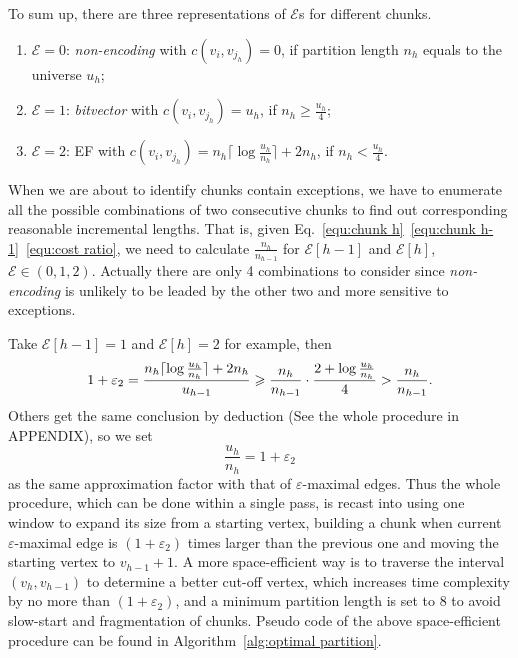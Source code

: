 \documentclass[runningheads]{comsis2}
\begin{document}
To sum up, there are three representations of $ \mathcal{E} $s for different chunks.
\begin{enumerate}
	\item $ \mathcal{E}=0 $: \textit{non-encoding} with $c\left(v_{i}, v_{j_{h}}\right)=0$, if partition length $n_{h}$ equals to the universe $u_{h}$;
	\item $ \mathcal{E}=1 $: \textit{bitvector} with $c\left(v_{i}, v_{j_{h}}\right)=u_{h}$, if $n_{h}\geqslant \frac{u_{h}}{4}$;
	\item $ \mathcal{E}=2 $: EF with $c\left(v_{i}, v_{j_{h}}\right)=n_{h}\lceil\log \frac{u_{h}}{n_{h}}\rceil+2n_{h}$, if $n_{h}<\frac{u_{h}}{4}$.
\end{enumerate}
When we are about to identify chunks contain exceptions, we have to enumerate all the possible combinations of two consecutive chunks to find out corresponding reasonable incremental lengths.
That is, given Eq.~\eqref{equ:chunk h}~\eqref{equ:chunk h-1}~\eqref{equ:cost ratio}, we need to calculate $ \frac{n_h}{n_{h-1}} $ for $ \mathcal{E}[h-1] $ and $ \mathcal{E}[h] $, $ \mathcal{E} \in (0, 1, 2) $.
Actually there are only 4 combinations to consider since \textit{non-encoding} is unlikely to be leaded by the other two and more sensitive to exceptions.

Take $ \mathcal{E}[h-1]=1 $ and $ \mathcal{E}[h]=2 $ for example, then
\begin{displaymath}
\noindent
1+\varepsilon_{2}=\frac{n_{h}\lceil\log \frac{u_{h}}{n_{h}}\rceil+2n_{h}}{u_{h-1}}\geqslant \frac{n_{h}}{n_{h-1}}\cdot \frac{2+\log \frac{u_{h}}{n_{h}}}{4}>\frac{n_{h}}{n_{h-1}}.
\end{displaymath}
Others get the same conclusion by deduction (See the whole procedure in APPENDIX), so we set
\begin{equation}
\frac{u_{h}}{n_{h}}=1+\varepsilon_2
\end{equation}
as the same approximation factor with that of $\varepsilon$-maximal edges.
Thus the whole procedure, which can be done within a single pass, is recast into using one window to expand its size from a starting vertex, building a chunk when current $\varepsilon$-maximal edge is $\left(1+\varepsilon_{2}\right)$ times larger than the previous one and moving the starting vertex to $v_{h-1}+1$.
A more space-efficient way is to traverse the interval $\left(v_{h}, v_{h-1}\right)$ to determine a better cut-off vertex, which increases time complexity by no more than $\left(1+\varepsilon_{2}\right)$, and a minimum partition length is set to 8 to avoid slow-start and fragmentation of chunks.
Pseudo code of the above space-efficient procedure can be found in Algorithm~\ref{alg:optimal partition}.
\end{document}

